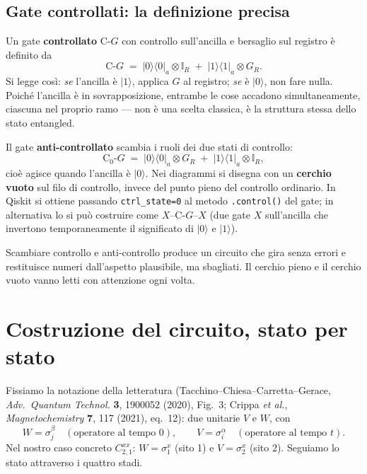 \documentclass[11pt,a4paper]{article}
\begin{document}
\subsection{Gate controllati: la definizione precisa}

Un gate \textbf{controllato} $\mathrm{C}\text{-}G$ con controllo sull'ancilla e bersaglio sul
registro è definito da
\begin{equation}
\mathrm{C}\text{-}G \;=\; |0\rangle\langle0|_a\otimes\mathbb{I}_R \;+\; |1\rangle\langle1|_a\otimes G_R .
\label{eq:ctrl}
\end{equation}
Si legge così: \emph{se} l'ancilla è $|1\rangle$, applica $G$ al registro; \emph{se} è
$|0\rangle$, non fare nulla. Poiché l'ancilla è in sovrapposizione, entrambe le cose accadono
simultaneamente, ciascuna nel proprio ramo --- non è una scelta classica, è la struttura stessa
dello stato entangled.

Il gate \textbf{anti-controllato} scambia i ruoli dei due stati di controllo:
\begin{equation}
\mathrm{C}_0\text{-}G \;=\; |0\rangle\langle0|_a\otimes G_R \;+\; |1\rangle\langle1|_a\otimes\mathbb{I}_R ,
\label{eq:antictrl}
\end{equation}
cioè agisce quando l'ancilla è $|0\rangle$. Nei diagrammi si disegna con un \textbf{cerchio
vuoto} sul filo di controllo, invece del punto pieno del controllo ordinario. In Qiskit si
ottiene passando \texttt{ctrl\_state=0} al metodo \texttt{.control()} del gate; in alternativa
lo si può costruire come
$X$--$\mathrm{C}\text{-}G$--$X$ (due gate $X$ sull'ancilla che invertono temporaneamente il
significato di $|0\rangle$ e $|1\rangle$).

\begin{warnbox}
Scambiare controllo e anti-controllo produce un circuito che gira senza errori e restituisce
numeri dall'aspetto plausibile, ma sbagliati. Il cerchio pieno e il cerchio vuoto vanno letti
con attenzione ogni volta.
\end{warnbox}

\section{Costruzione del circuito, stato per stato}

Fissiamo la notazione della letteratura (Tacchino--Chiesa--Carretta--Gerace,
\textit{Adv.\ Quantum Technol.} \textbf{3}, 1900052 (2020), Fig.~3; Crippa \textit{et al.},
\textit{Magnetochemistry} \textbf{7}, 117 (2021), eq.~12): due unitarie $V$ e $W$, con
\begin{equation}
W=\sigma_j^\beta \quad(\text{operatore al tempo }0),
\qquad
V=\sigma_i^\alpha \quad(\text{operatore al tempo }t).
\end{equation}
Nel nostro caso concreto $C_{2,1}^{xx}$: $W=\sigma_1^x$ (sito 1) e $V=\sigma_2^x$ (sito 2).
Seguiamo lo stato attraverso i quattro stadi.
\end{document}
